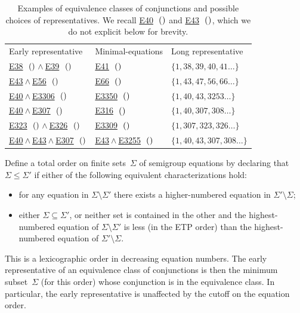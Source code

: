 \documentclass[12pt]{amsart}
\theoremstyle{plain}
\theoremstyle{definition}
\newcommand{\Equaref}[1]{\href{https://teorth.github.io/equational_theories/implications/?#1}{\textrm{\textup{E}}#1}}
\newcommand{\Equareffull}[1]{\Equaref{#1}\ifmmode\,\else\ \fi\ensuremath{(\csname Equa#1\endcsname)}}
\begin{document}
\begin{table}
\caption{\label{tab:example-classes}Examples of equivalence classes of conjunctions and possible choices of representatives.  We recall \Equareffull{40} and \Equareffull{43}, which we do not explicit below for brevity.}
\centering\scriptsize
\begin{tabular}{lll}
  \toprule
  Early representative & Minimal-equations & Long representative \\
  \Equareffull{38}${}\wedge{}$\Equareffull{39} & \Equareffull{41} & $\{1, 38, 39, 40, 41\dots\}$ \\
  \Equaref{43}${}\wedge{}$\Equareffull{56} & \Equareffull{66} & $\{1, 43, 47, 56, 66\dots\}$ \\
  \Equaref{40}${}\wedge{}$\Equareffull{3306} & \Equareffull{3350} & $\{1, 40, 43, 3253\dots\}$ \\
  \Equaref{40}${}\wedge{}$\Equareffull{307} & \Equareffull{316} & $\{1, 40, 307, 308\dots\}$ \\
  \Equareffull{323}${}\wedge{}$\Equareffull{326} & \Equareffull{3309} & $\{1, 307, 323, 326\dots\}$ \\
  \Equaref{40}${}\wedge{}$\Equaref{43}${}\wedge{}$\Equareffull{307} & \Equaref{43}${}\wedge{}$\Equareffull{3255} & $\{1, 40, 43, 307, 308\dots\}$ \\
  \bottomrule
\end{tabular}
\end{table}

\begin{proposition}\label{prop:early-cutoff}
  Define a total order on finite sets~$\Sigma$ of semigroup equations by declaring that $\Sigma\leq\Sigma'$ if either of the following equivalent characterizations hold:
  \begin{itemize}
  \item for any equation in $\Sigma\setminus\Sigma'$ there exists a higher-numbered equation in $\Sigma'\setminus\Sigma$;
  \item either $\Sigma\subseteq\Sigma'$, or neither set is contained in the other and the highest-numbered equation of $\Sigma\setminus\Sigma'$ is less (in the ETP order) than the highest-numbered equation of $\Sigma'\setminus\Sigma$.
  \end{itemize}
  This is a lexicographic order in decreasing equation numbers.
  The early representative of an equivalence class of conjunctions is then the minimum subset~$\Sigma$ (for this order) whose conjunction is in the equivalence class.
  In particular, the early representative is unaffected by the cutoff on the equation order.
\end{proposition}
\end{document}
